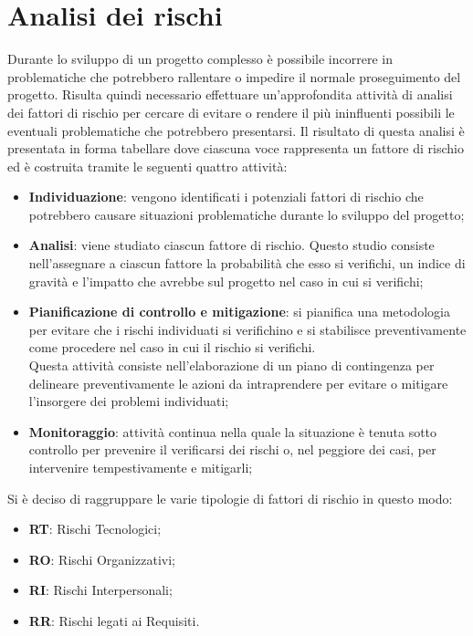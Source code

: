 \section{Analisi dei rischi}
Durante lo sviluppo di un progetto complesso è possibile incorrere in problematiche che potrebbero rallentare o impedire il normale proseguimento del progetto. Risulta quindi necessario effettuare un'approfondita attività di analisi dei fattori di rischio per cercare di evitare o rendere il più ininfluenti possibili le eventuali problematiche che potrebbero presentarsi.
Il risultato di questa analisi è presentata in forma tabellare dove ciascuna voce rappresenta un fattore di rischio ed è costruita tramite le seguenti quattro attività:
\begin{itemize}
		\item \textbf{Individuazione}: vengono identificati i potenziali fattori di rischio che potrebbero causare situazioni problematiche durante lo sviluppo del progetto;
		\item \textbf{Analisi}: viene studiato ciascun fattore di rischio. Questo studio consiste nell'assegnare a ciascun fattore la probabilità che esso si verifichi, un indice di gravità e l'impatto che avrebbe sul progetto nel caso in cui si verifichi;
		\item \textbf{Pianificazione di controllo e mitigazione}: si pianifica una metodologia per evitare che i rischi individuati si verifichino e si stabilisce preventivamente come procedere nel caso in cui il rischio si verifichi. \\
		Questa attività consiste nell'elaborazione di un piano di contingenza per delineare preventivamente le azioni da intraprendere per evitare o mitigare l'insorgere dei problemi individuati;
		\item \textbf{Monitoraggio}: attività continua nella quale la situazione è tenuta sotto controllo per prevenire il verificarsi dei rischi o, nel peggiore dei casi, per intervenire tempestivamente e mitigarli; \\

\end{itemize}


Si è deciso di raggruppare le varie tipologie di fattori di rischio in questo modo:
\begin{itemize}
	\item \textbf{RT}: Rischi Tecnologici;
	\item \textbf{RO}: Rischi Organizzativi;
	\item \textbf{RI}: Rischi Interpersonali;
	\item \textbf{RR}: Rischi legati ai Requisiti.
\end{itemize}

